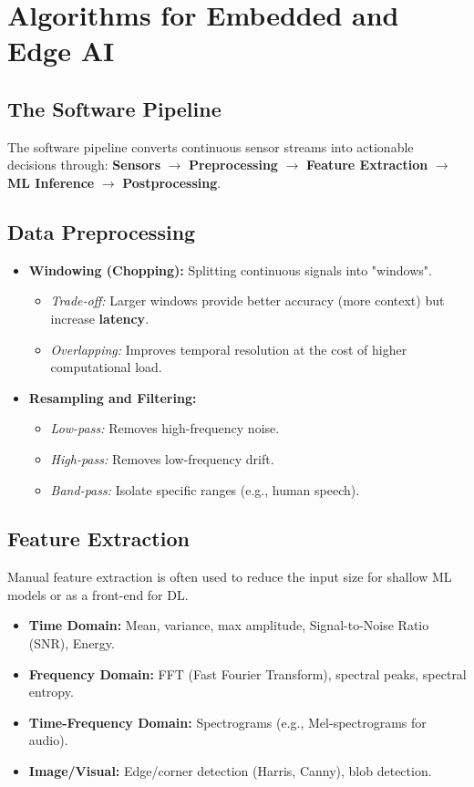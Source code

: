 \section{Algorithms for Embedded and Edge AI}

\subsection{The Software Pipeline}
The software pipeline converts continuous sensor streams into actionable decisions through:
\textbf{Sensors} $\rightarrow$ \textbf{Preprocessing} $\rightarrow$ \textbf{Feature Extraction} $\rightarrow$ \textbf{ML Inference} $\rightarrow$ \textbf{Postprocessing}.

\subsection{Data Preprocessing}
\begin{itemize}
    \item \textbf{Windowing (Chopping):} Splitting continuous signals into "windows".
    \begin{itemize}
        \item \textit{Trade-off:} Larger windows provide better accuracy (more context) but increase \textbf{latency}.
        \item \textit{Overlapping:} Improves temporal resolution at the cost of higher computational load.
    \end{itemize}
    \item \textbf{Resampling and Filtering:}
    \begin{itemize}
        \item \textit{Low-pass:} Removes high-frequency noise.
        \item \textit{High-pass:} Removes low-frequency drift.
        \item \textit{Band-pass:} Isolate specific ranges (e.g., human speech).
    \end{itemize}
\end{itemize}

\subsection{Feature Extraction}
Manual feature extraction is often used to reduce the input size for shallow ML models or as a front-end for DL.
\begin{itemize}
    \item \textbf{Time Domain:} Mean, variance, max amplitude, Signal-to-Noise Ratio (SNR), Energy.
    \item \textbf{Frequency Domain:} FFT (Fast Fourier Transform), spectral peaks, spectral entropy.
    \item \textbf{Time-Frequency Domain:} Spectrograms (e.g., Mel-spectrograms for audio).
    \item \textbf{Image/Visual:} Edge/corner detection (Harris, Canny), blob detection.
\end{itemize}

